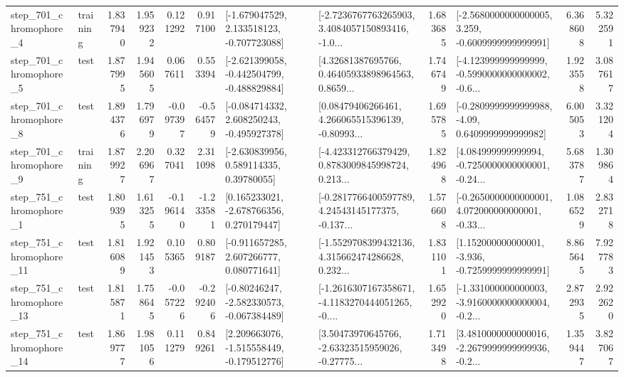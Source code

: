 \begin{tabular}{llrrrrllrlrr}
   step\_701\_chromophore\_4 &  training &      1.837940 &    1.959232 &      0.121292 &  0.917100 &   [-1.679047529, 2.133518123, -0.707723088] &  [-2.7236767763265903, 3.4084057150893416, -1.0... &       1.683685 &  [-2.5680000000000005, 3.259, -0.6009999999999991] &            6.368608 &          5.322591 \\
   step\_701\_chromophore\_5 &      test &      1.877995 &    1.945605 &      0.067611 &  0.553394 &  [-2.621399058, -0.442504799, -0.488829884] &  [4.32681387695766, 0.46405933898964563, 0.8659... &       1.746749 &  [-4.123999999999999, -0.5990000000000002, -0.6... &            1.923558 &          3.087617 \\
   step\_701\_chromophore\_8 &      test &      1.894376 &    1.796979 &     -0.097397 & -0.564579 &   [-0.084714332, 2.608250243, -0.495927378] &  [0.08479406266461, 4.266065515396139, -0.80993... &       1.695785 &   [-0.2809999999999988, -4.09, 0.6409999999999982] &            6.005053 &          3.321204 \\
   step\_701\_chromophore\_9 &  training &      1.879927 &    2.206967 &      0.327041 &  2.311098 &     [-2.630839956, 0.589114335, 0.39780055] &  [-4.423312766379429, 0.8783009845998724, 0.213... &       1.824968 &  [4.084999999999994, -0.7250000000000001, -0.24... &            5.683787 &          1.309864 \\
   step\_751\_chromophore\_1 &      test &      1.809395 &    1.613255 &     -0.196140 & -1.233581 &    [0.165233021, -2.678766356, 0.270179447] &  [-0.2817766400597789, 4.24543145177375, -0.137... &       1.576608 &  [-0.2650000000000001, 4.072000000000001, -0.33... &            1.086529 &          2.832718 \\
  step\_751\_chromophore\_11 &      test &      1.816089 &    1.921453 &      0.105365 &  0.809187 &    [-0.911657285, 2.607266777, 0.080771641] &  [-1.5529708399432136, 4.315662474286628, 0.232... &       1.831101 &   [1.152000000000001, -3.936, -0.7259999999999991] &            8.865645 &          7.927783 \\
  step\_751\_chromophore\_13 &      test &      1.815871 &    1.758645 &     -0.057226 & -0.292406 &   [-0.80246247, -2.582330573, -0.067384489] &  [-1.2616307167358671, -4.1183270444051265, -0.... &       1.652920 &  [-1.331000000000003, -3.9160000000000004, -0.2... &            2.872935 &          2.922620 \\
  step\_751\_chromophore\_14 &      test &      1.869777 &    1.981056 &      0.111279 &  0.849261 &   [2.209663076, -1.515558449, -0.179512776] &  [3.50473970645766, -2.63323515959026, -0.27775... &       1.713498 &  [3.4810000000000016, -2.2679999999999936, -0.2... &            1.359447 &          3.827067 \\

\end{tabular}
